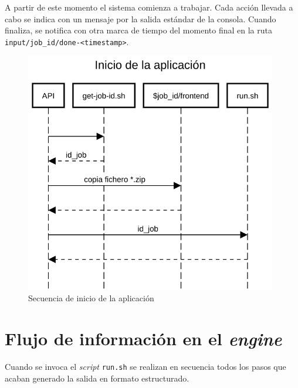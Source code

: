 A partir de este momento el sistema comienza a trabajar. Cada acción llevada a cabo se indica con un mensaje por la salida estándar de la consola. Cuando finaliza, se notifica con otra marca de tiempo del momento final en la ruta \verb|input/job_id/done-<timestamp>|.

\begin{figure}[hp!]
    \centering
    \includegraphics[width=11cm]{imaxes/h-implementacion/inicio-aplicacion.png}
    \caption{Secuencia de inicio de la aplicación}
    \label{fig:inicio-aplicacion}
\end{figure}


\section{Flujo de información en el \emph{engine}}

Cuando se invoca el \emph{script} \verb|run.sh| se realizan en secuencia todos los pasos que acaban generado la salida en formato estructurado.




